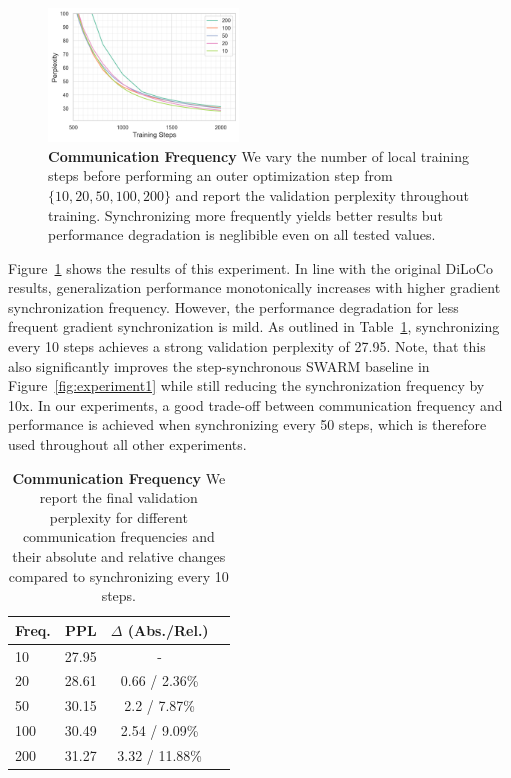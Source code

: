 \documentclass{article}
\begin{document}
\begin{figure}[ht]
  \centering
  \includegraphics[width=0.45\textwidth]{figures/experiment3.png}
  \caption{\textbf{Communication Frequency} We vary the number of local training
  steps before performing an outer optimization step from $\{10, 20, 50, 100, 200\}$ 
  and report the validation perplexity throughout training. Synchronizing more
  frequently yields better results but performance degradation is neglibible even
  on all tested values.}
  \label{fig:experiment2}
\end{figure}

Figure~\ref{fig:experiment2} shows the results of this experiment. In line with
the original DiLoCo results, generalization performance monotonically increases
with higher gradient synchronization frequency. However, the performance
degradation for less frequent gradient synchronization is mild. As outlined in
Table~\ref{tab:experiment2}, synchronizing every 10 steps achieves a strong
validation perplexity of 27.95. Note, that this also significantly improves the
step-synchronous SWARM baseline in Figure~\ref{fig:experiment1} while still
reducing the synchronization frequency by 10x. In our experiments, a good
trade-off between communication frequency and performance is achieved when
synchronizing every 50 steps, which is therefore used throughout all other
experiments.

\begin{table}[ht]
\centering
\begin{tabular}{lccc}
\toprule
\textbf{Freq.} & \textbf{PPL} & \textbf{$\Delta$ (Abs./Rel.)} \\ 
\midrule
10 & 27.95 & - \\
20 & 28.61 & 0.66 / 2.36\% \\
50 & 30.15 & 2.2 / 7.87\% \\
100 & 30.49 & 2.54 / 9.09\% \\
200 & 31.27 & 3.32 / 11.88\% \\
\bottomrule
\end{tabular}
\caption{\textbf{Communication Frequency} We report the final validation
perplexity for different communication frequencies and their absolute and
relative changes compared to synchronizing every 10 steps.}
\label{tab:experiment2}
\end{table}
\end{document}
